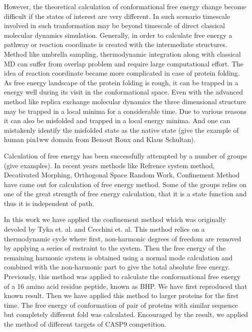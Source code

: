 \documentclass[12pt]{article}
\begin{document}
However, the theoretical calculation of conformational free energy change become difficult if the
states of interest are very different. In such scenario timescale involved in such tranformation may
be beyond timescale of direct classical molecular dynamics simulation.  Generally, in order to
calculate free energy a pathway or reaction coordinate is created with the intermediate structures.
Method like umbrella sampling, thermodynamic integration along with classical MD can suffer from
overlap problem and require large computational effort. The idea of reaction coordinate became more
complicated in case of protein folding.  As free energy landscape of the protein folding is rough,
it can be trapped in a energy well during its visit in the conformational space. Even with the
advanced method like replica exchange molecular dynamics the three dimensional structure may be
trapped in a local minima for a considerable time. Due to various reasons it can also be misfolded
and trapped in a local energy minima. And one can mistakenly identify the misfolded state as the
native state (give the example of human pin1ww domain from Benout Roux and Klaus Schultan).

Calculation of free energy has been successfully attempted by a number of groups (give examples). In
recent years methods like Refrence system method, Decativated Morphing, Orthogonal Space Random
Work, Confinement Method have came out for calculation of free energy method. Some of the groups
relies on one of the great strength of free energy calculation, that it is a state function and thus
it is independent of path.

In this work we have applied the confinement method which was originally devoled by Tyka et. al. and
Cecchini et. al.  This method relies on a thermodynamic cycle where first, non-harmonic degrees of
freedom are removed by applying a series of restraint to the system. Then the free energy of the
remaining harmonic system is obtained using a normal mode calculation and combined with the
non-harmonic part to give the total absolute free energy.  Previously, this method was applied to
calculate the conformational free energy of a 16 amino acid residue peptide, known as BHP.  We have
first reproduced that known result. Then we have applied this method to larger proteins for the
first time. The free energy of conformation of pair of proteins with similar sequence but completely
different fold was calculated. Encouraged by the result, we applied the method of different targets
of CASP9 competition.
\end{document}
